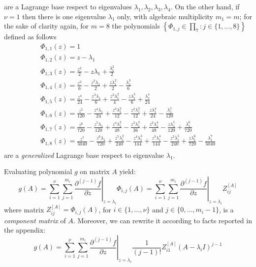 are a Lagrange base respect to eigenvalues $\lambda_{1}, \lambda_{2},\lambda_{3},\lambda_{4}$.
On the other hand, if $\nu=1$ then there is one eigenvalue $\lambda_{1}$ only, with algebraic multiplicity $m_{1}=m$; for the sake of clarity again,
for $m=8$ the polynomials $\left\lbrace \Phi_{1,j}\in\prod_{7}:j\in\lbrace1,\ldots,8\rbrace \right\rbrace$ defined as follows
\begin{equation}
\begin{array}{c}
\Phi_{ 1, 1 }{\left (z \right )} = 1 \\ 
\Phi_{ 1, 2 }{\left (z \right )} = z - \lambda_{1} \\ 
\Phi_{ 1, 3 }{\left (z \right )} = \frac{z^{2}}{2} - z \lambda_{1} + \frac{\lambda_{1}^{2}}{2}\\ 
\Phi_{ 1, 4 }{\left (z \right )} = \frac{z^{3}}{6} - \frac{z^{2} \lambda_{1}}{2} + \frac{z \lambda_{1}^{2}}{2} - \frac{\lambda_{1}^{3}}{6} \\ 
\Phi_{ 1, 5 }{\left (z \right )} = \frac{z^{4}}{24} - \frac{z^{3} \lambda_{1}}{6} + \frac{z^{2} \lambda_{1}^{2}}{4} - \frac{z \lambda_{1}^{3}}{6} + \frac{\lambda_{1}^{4}}{24} \\ 
\Phi_{ 1, 6 }{\left (z \right )} = \frac{z^{5}}{120} - \frac{z^{4} \lambda_{1}}{24} + \frac{z^{3} \lambda_{1}^{2}}{12} - \frac{z^{2} \lambda_{1}^{3}}{12} + \frac{z \lambda_{1}^{4}}{24} - \frac{\lambda_{1}^{5}}{120} \\
\Phi_{ 1, 7 }{\left (z \right )} = \frac{z^{6}}{720} - \frac{z^{5} \lambda_{1}}{120} + \frac{z^{4} \lambda_{1}^{2}}{48} - \frac{z^{3} \lambda_{1}^{3}}{36} + \frac{z^{2} \lambda_{1}^{4}}{48} - \frac{z \lambda_{1}^{5}}{120} + \frac{\lambda_{1}^{6}}{720} \\ 
\Phi_{ 1, 8 }{\left (z \right )} = \frac{z^{7}}{5040} - \frac{z^{6} \lambda_{1}}{720} + \frac{z^{5} \lambda_{1}^{2}}{240} - \frac{z^{4} \lambda_{1}^{3}}{144} + \frac{z^{3} \lambda_{1}^{4}}{144} - \frac{z^{2} \lambda_{1}^{5}}{240} + \frac{z \lambda_{1}^{6}}{720} - \frac{\lambda_{1}^{7}}{5040}\\
\end{array}
\label{eq:generalized-Lagrange-base}
\end{equation}
are a \textit{generalized} Lagrange base respect to eigenvalue $\lambda_{1}$.

Evaluating polynomial $g$ on matrix $A$ yield:
\begin{displaymath}
g(A) = \sum_{i=1}^{\nu}{\sum_{j=1}^{m_{i}}{ \left.  \frac{\partial^{(j-1)}{f}}{\partial{z}} \right|_{z=\lambda_{i}}\Phi_{i,j}(A) }}
     = \sum_{i=1}^{\nu}{\sum_{j=1}^{m_{i}}{ \left.  \frac{\partial^{(j-1)}{f}}{\partial{z}} \right|_{z=\lambda_{i}}Z_{ij}^{[A]} }}
\end{displaymath}
where matrix $Z_{ij}^{[A]}=\Phi_{i,j}(A)$, for $i\in \lbrace 1, \ldots, \nu \rbrace$
and $j \in \lbrace 0, \ldots, m_{i}-1 \rbrace$, is a \textit{component matrix}
of $A$. Moreover, we can rewrite it according to facts reported in the appendix:
\begin{displaymath}
g(A) = \sum_{i=1}^{\nu}{\sum_{j=1}^{m_{i}}{ \left.  \frac{\partial^{(j-1)}{f}}{\partial{z}} \right|_{z=\lambda_{i}}\frac{1}{(j-1)!}{Z_{i1}^{[A]}(A-\lambda_{i}I)^{j-1}} }}
\end{displaymath}

